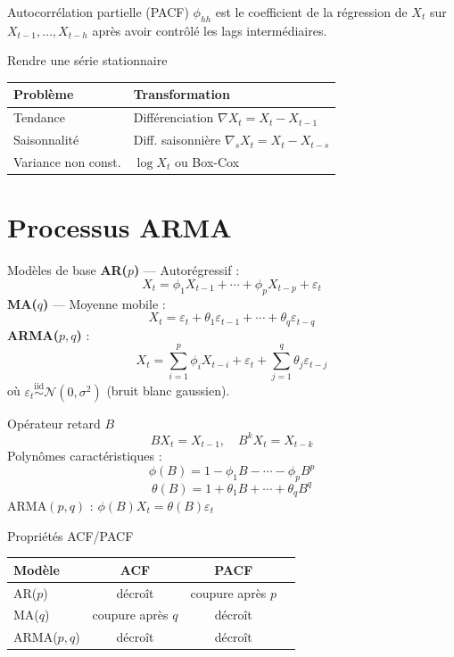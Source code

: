 \documentclass[10pt,a4paper,twocolumn]{article}
\begin{document}
\begin{formulebox}{Autocorrélation partielle (PACF)}
$\phi_{hh}$ est le coefficient de la régression de $X_t$ sur $X_{t-1},\ldots,X_{t-h}$ après avoir contrôlé les lags intermédiaires.
\end{formulebox}

\begin{defbox}{Rendre une série stationnaire}
\begin{tabular}{@{}ll@{}}
\toprule
Problème & Transformation \\
\midrule
Tendance & Différenciation $\nabla X_t = X_t - X_{t-1}$ \\
Saisonnalité & Diff. saisonnière $\nabla_s X_t = X_t - X_{t-s}$ \\
Variance non const. & $\log X_t$ ou Box-Cox \\
\bottomrule
\end{tabular}
\end{defbox}

\section{Processus ARMA}

\begin{formulebox}{Modèles de base}
\textbf{AR($p$)} — Autorégressif :
\[
X_t = \phi_1 X_{t-1} + \cdots + \phi_p X_{t-p} + \varepsilon_t
\]
\textbf{MA($q$)} — Moyenne mobile :
\[
X_t = \varepsilon_t + \theta_1\varepsilon_{t-1} + \cdots + \theta_q\varepsilon_{t-q}
\]
\textbf{ARMA($p,q$)} :
\[
X_t = \sum_{i=1}^p \phi_i X_{t-i} + \varepsilon_t + \sum_{j=1}^q \theta_j \varepsilon_{t-j}
\]
où $\varepsilon_t \overset{\text{iid}}{\sim} \mathcal{N}(0,\sigma^2)$ (bruit blanc gaussien).
\end{formulebox}

\begin{formulebox}{Opérateur retard $B$}
\[
B X_t = X_{t-1}, \quad B^k X_t = X_{t-k}
\]
Polynômes caractéristiques :
\[
\phi(B) = 1 - \phi_1 B - \cdots - \phi_p B^p
\]
\[
\theta(B) = 1 + \theta_1 B + \cdots + \theta_q B^q
\]
ARMA$(p,q)$ : $\phi(B)X_t = \theta(B)\varepsilon_t$
\end{formulebox}

\begin{defbox}{Propriétés ACF/PACF}
\begin{tabular}{@{}lccc@{}}
\toprule
Modèle & ACF & PACF \\
\midrule
AR($p$) & décroît & coupure après $p$ \\
MA($q$) & coupure après $q$ & décroît \\
ARMA($p,q$) & décroît & décroît \\
\bottomrule
\end{tabular}
\end{defbox}
\end{document}

